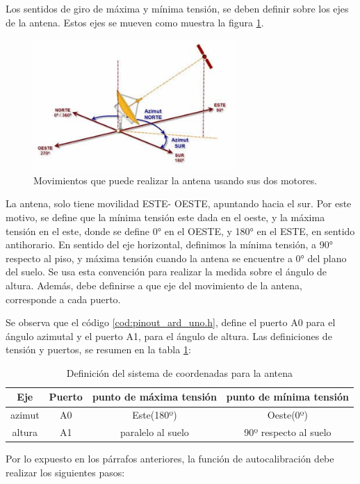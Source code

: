 Los sentidos de giro de máxima y mínima tensión, se deben definir sobre los ejes de la antena. Estos ejes se mueven como muestra la figura \ref{fig:mov_antena}. 

\begin{figure}[ht]
	\centering
	\includegraphics[height=5cm]{mov_antena}
	\caption{Movimientos que puede realizar la antena usando sus dos motores.}
	\label{fig:mov_antena}	
\end{figure}


La antena, solo tiene movilidad ESTE- OESTE, apuntando hacia el sur. Por este motivo, se define que la mínima tensión este dada en el oeste, y la máxima tensión en el este, donde se define 0° en el OESTE, y 180° en el ESTE, en sentido antihorario. En sentido del eje horizontal, definimos la mínima tensión, a 90° respecto al piso, y máxima tensión cuando la antena se encuentre a 0° del plano del suelo. Se usa esta convención para realizar la medida sobre el ángulo de altura. Además, debe definirse a que eje del movimiento de la antena, corresponde a cada puerto.

Se observa que el código \ref{cod:pinout_ard_uno.h}, define el puerto A0 para el ángulo azimutal y el puerto A1, para el ángulo de altura. Las definiciones de tensión y puertos, se resumen en la tabla \ref{tab:def_sist_coord}: 
\begin{table}[ht]
	\centering 
	\begin{tabular}{|c|c|c|c|}
		\hline
		Eje & Puerto & punto de máxima tensión & punto de mínima tensión\\ 
		\hline
		azimut &A0 & Este(180º) & Oeste(0º) 	 \\    
		\hline
		altura  &A1 &  paralelo al suelo& 90º respecto al suelo  \\
		\hline
	\end{tabular}
	\caption{Definición del sistema de coordenadas para la antena}
	\label{tab:def_sist_coord}
\end{table}

Por lo expuesto en los párrafos anteriores, la función de autocalibración debe realizar los siguientes pasos: 

